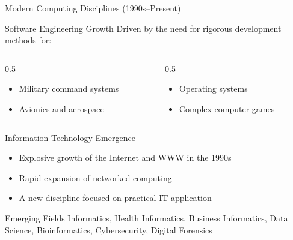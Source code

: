 \documentclass[aspectratio=169]{beamer}
\begin{document}
\begin{frame}{Modern Computing Disciplines (1990s--Present)}
  \begin{block}{Software Engineering Growth}
    Driven by the need for rigorous development methods for:
    \begin{columns}[T]
      \begin{column}{0.5\textwidth}
        \begin{itemize}
          \item Military command systems
          \item Avionics and aerospace
        \end{itemize}
      \end{column}
      \begin{column}{0.5\textwidth}
        \begin{itemize}
          \item Operating systems
          \item Complex computer games
        \end{itemize}
      \end{column}
    \end{columns}
  \end{block}
  \begin{block}{Information Technology Emergence}
    \begin{itemize}
      \item Explosive growth of the Internet and WWW in the 1990s
      \item Rapid expansion of networked computing
      \item A new discipline focused on practical IT application
    \end{itemize}
  \end{block}
  \begin{exampleblock}{Emerging Fields}
    \small Informatics, Health Informatics, Business Informatics, Data Science,
    Bioinformatics, Cybersecurity, Digital Forensics
  \end{exampleblock}
\end{frame}
\end{document}
